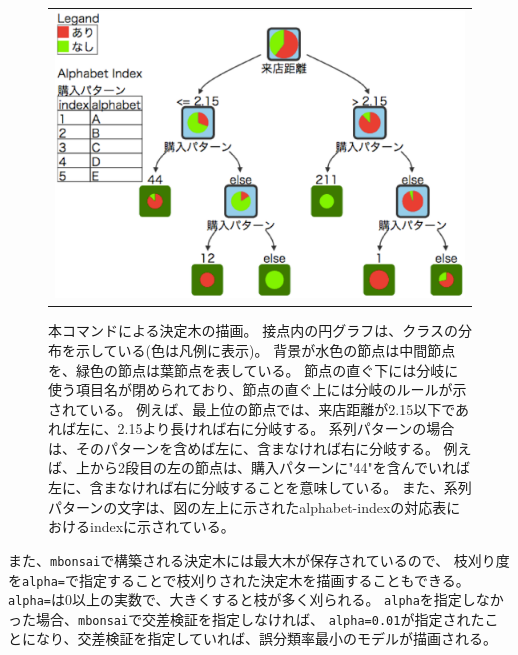 \begin{figure}[htbp]
\begin{center}
\begin{tabular}{c}

\begin{minipage}{0.9\hsize}
\begin{center}
\includegraphics[scale=0.5]{figure/tree_1.eps}
\caption{本コマンドによる決定木の描画。
接点内の円グラフは、クラスの分布を示している(色は凡例に表示)。
背景が水色の節点は中間節点を、緑色の節点は葉節点を表している。
節点の直ぐ下には分岐に使う項目名が閉められており、節点の直ぐ上には分岐のルールが示されている。
例えば、最上位の節点では、来店距離が2.15以下であれば左に、2.15より長ければ右に分岐する。
系列パターンの場合は、そのパターンを含めば左に、含まなければ右に分岐する。
例えば、上から2段目の左の節点は、購入パターンに"44"を含んでいれば左に、含まなければ右に分岐することを意味している。
また、系列パターンの文字は、図の左上に示されたalphabet-indexの対応表におけるindexに示されている。
\label{fig:mdtree_tree_1}}
\end{center}
\end{minipage}

\end{tabular}
\end{center}
\end{figure}

また、\verb|mbonsai|で構築される決定木には最大木が保存されているので、
枝刈り度を\verb|alpha=|で指定することで枝刈りされた決定木を描画することもできる。
\verb|alpha=|は0以上の実数で、大きくすると枝が多く刈られる。
\verb|alpha|を指定しなかった場合、\verb|mbonsai|で交差検証を指定しなければ、
\verb|alpha=0.01|が指定されたことになり、交差検証を指定していれば、誤分類率最小のモデルが描画される。

